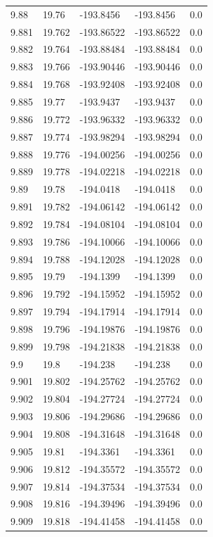\begin{tabular}{lllll}
9.88 & 19.76 & -193.8456 & -193.8456 & 0.0 \\
9.881 & 19.762 & -193.86522 & -193.86522 & 0.0 \\
9.882 & 19.764 & -193.88484 & -193.88484 & 0.0 \\
9.883 & 19.766 & -193.90446 & -193.90446 & 0.0 \\
9.884 & 19.768 & -193.92408 & -193.92408 & 0.0 \\
9.885 & 19.77 & -193.9437 & -193.9437 & 0.0 \\
9.886 & 19.772 & -193.96332 & -193.96332 & 0.0 \\
9.887 & 19.774 & -193.98294 & -193.98294 & 0.0 \\
9.888 & 19.776 & -194.00256 & -194.00256 & 0.0 \\
9.889 & 19.778 & -194.02218 & -194.02218 & 0.0 \\
9.89 & 19.78 & -194.0418 & -194.0418 & 0.0 \\
9.891 & 19.782 & -194.06142 & -194.06142 & 0.0 \\
9.892 & 19.784 & -194.08104 & -194.08104 & 0.0 \\
9.893 & 19.786 & -194.10066 & -194.10066 & 0.0 \\
9.894 & 19.788 & -194.12028 & -194.12028 & 0.0 \\
9.895 & 19.79 & -194.1399 & -194.1399 & 0.0 \\
9.896 & 19.792 & -194.15952 & -194.15952 & 0.0 \\
9.897 & 19.794 & -194.17914 & -194.17914 & 0.0 \\
9.898 & 19.796 & -194.19876 & -194.19876 & 0.0 \\
9.899 & 19.798 & -194.21838 & -194.21838 & 0.0 \\
9.9 & 19.8 & -194.238 & -194.238 & 0.0 \\
9.901 & 19.802 & -194.25762 & -194.25762 & 0.0 \\
9.902 & 19.804 & -194.27724 & -194.27724 & 0.0 \\
9.903 & 19.806 & -194.29686 & -194.29686 & 0.0 \\
9.904 & 19.808 & -194.31648 & -194.31648 & 0.0 \\
9.905 & 19.81 & -194.3361 & -194.3361 & 0.0 \\
9.906 & 19.812 & -194.35572 & -194.35572 & 0.0 \\
9.907 & 19.814 & -194.37534 & -194.37534 & 0.0 \\
9.908 & 19.816 & -194.39496 & -194.39496 & 0.0 \\
9.909 & 19.818 & -194.41458 & -194.41458 & 0.0 \\

\end{tabular}
